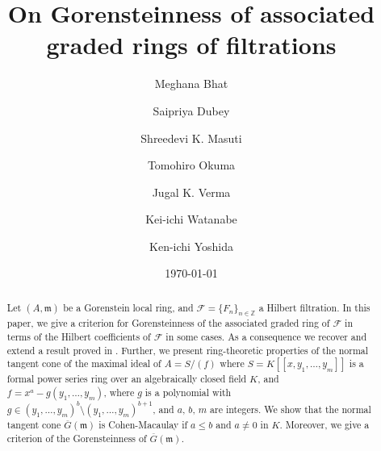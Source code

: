 \documentclass[12pt]{amsart}
\title[Gorenstein associated graded rings of filtrations]{On Gorensteinness of associated graded rings of filtrations}
\author[Bhat]{Meghana Bhat}
\author[Dubey]{Saipriya Dubey}
\author[Masuti]{Shreedevi K. Masuti}
\author[Okuma]{Tomohiro Okuma}
\author[Verma]{Jugal K. Verma}
\author[Watanabe]{Kei-ichi Watanabe}
\author[Yoshida]{Ken-ichi Yoshida}
\date{\today}
\theoremstyle{definition}
\theoremstyle{remark}
\numberwithin{equation}{section}
\newcommand{\m}{{\mathfrak m}}
\newcommand{\FF}{\mathcal{F}}
\begin{document}

\begin{abstract}
Let $(A, \m)$ be a Gorenstein local ring, 
and $\FF =\{F_n \}_{n\in \mathbb{Z}}$ a Hilbert filtration. In this paper, 
we give a  criterion for Gorensteinness of the associated graded ring 
of $\FF$ in terms of the Hilbert coefficients of $\FF$ in some cases. 
As a consequence we recover and extend a result proved in
\cite{OWY6}.  
Further, we present ring-theoretic properties of the normal tangent 
cone of the maximal ideal of $A=S/(f)$ 
where $S=K[\![x, y_1,\ldots, y_m]\!]$ is a formal power series ring 
over an algebraically closed field $K$, 
and $f=x^a-g(y_1,\ldots,y_m)$, where $g$ is a polynomial with 
$g \in (y_1,\ldots,y_m)^b \setminus (y_1,\ldots,y_m)^{b+1}$, 
and $a, \, b, \, m$ are integers.
We show that the normal tangent cone $\overline{G}(\m)$  
is Cohen-Macaulay if $a \le b$ and $a \ne 0$ in $K$.   
Moreover, we give a criterion of the Gorensteinness of $\overline{G}(\m)$. 
\end{abstract}
    

\maketitle
\end{document}
